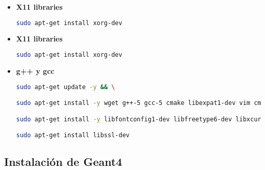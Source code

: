 \begin{itemize}
    
    \item \textbf{X11 libraries}%
    
\begin{lstlisting}[language=bash,style=mystyle]
sudo apt-get install xorg-dev
\end{lstlisting}  


    \item \textbf{X11 libraries}%
    
\begin{lstlisting}[language=bash,style=mystyle]
sudo apt-get install xorg-dev
\end{lstlisting} 


    \item \textbf{g++ y gcc}%
    
\begin{lstlisting}[language=bash,style=mystyle]
sudo apt-get update -y && \

sudo apt-get install -y wget g++-5 gcc-5 cmake libexpat1-dev vim cmake-curses-gui freeglut3 freeglut3-dev mesa-utils python libx11-dev libxmu-dev expat && \

sudo apt-get install -y libfontconfig1-dev libfreetype6-dev libxcursor-dev libxext-dev libxfixes-dev libxft-dev libxi-dev libxrandr-dev libxrender-dev && \

sudo apt-get install libssl-dev
\end{lstlisting} 


\end{itemize}{}


\newpage

\subsection{Instalación de Geant4}

